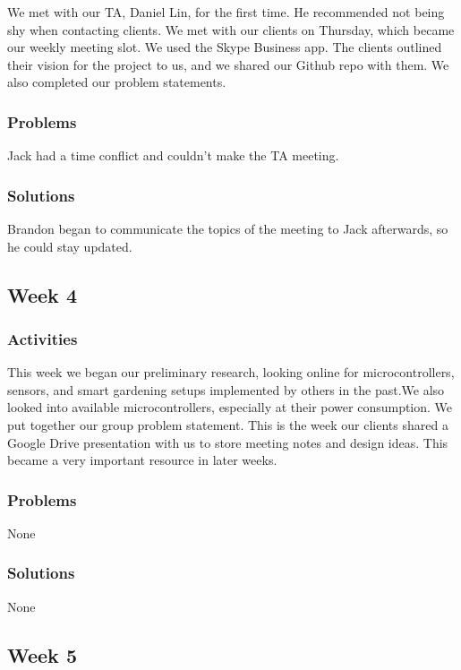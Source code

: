 \documentclass[IEEEtran,letterpaper,10pt,titlepage,fleqn,draftclsnofoot,onecolumn]{article}
\begin{document}
We met with our TA, Daniel Lin, for the first time. He recommended not being shy when contacting clients. We met with our clients on Thursday, which became our weekly meeting slot. We used the Skype Business app. The clients outlined their vision for the project to us, and we shared our Github repo with them. We also completed our problem statements. 

\subsubsection{Problems}

Jack had a time conflict and couldn’t make the TA meeting. 

\subsubsection{Solutions}

Brandon began to communicate the topics of the meeting to Jack afterwards, so he could stay updated.

\subsection{Week 4}
\subsubsection{Activities}

This week we began our preliminary research, looking online for microcontrollers, sensors, and smart gardening setups implemented by others in the past.We also looked into available microcontrollers, especially at their power consumption. We put together our group problem statement. This is the week our clients shared a Google Drive presentation with us to store meeting notes and design ideas. This became a very important resource in later weeks. 

\subsubsection{Problems}

None

\subsubsection{Solutions}

None

\subsection{Week 5}
\end{document}
